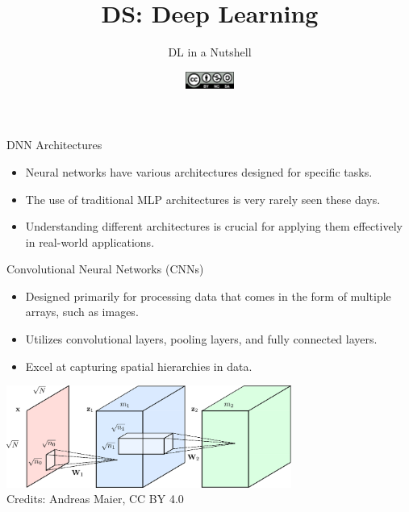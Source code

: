 \documentclass[aspectratio=169]{../latex_main/tntbeamer}  %
\title[DL in a Nutshell]{DS: Deep Learning}
\subtitle{DL in a Nutshell}
\date{\hspace{0.5em} {\includegraphics[height=1.5em]{../latex_main/figures/Cc-by-nc-sa_icon.svg.png}}}
\begin{document}
	
	\maketitle
    	\begin{frame}{DNN Architectures}

            \begin{itemize}
                \item Neural networks have various architectures designed for specific tasks.
                \item The use of traditional MLP architectures is very rarely seen these days.
                \item Understanding different architectures is crucial for applying them effectively in real-world applications.
            \end{itemize}
    
                    
    	\end{frame}

        \begin{frame}{Convolutional Neural Networks (CNNs)}
        \begin{itemize}
            \item Designed primarily for processing data that comes in the form of multiple arrays, such as images.
            \item Utilizes convolutional layers, pooling layers, and fully connected layers.
            \item Excel at capturing spatial hierarchies in data.
        \end{itemize}
        \centering
        \includegraphics[width=0.7\textwidth]{figures/conv.png}\\
        Credits: Andreas Maier, CC BY 4.0
        \end{frame}
\end{document}
